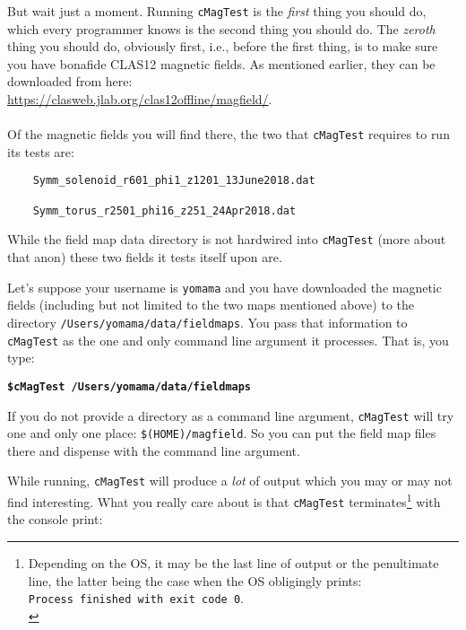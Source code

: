\documentclass{article}
\begin{document}
But wait just a moment. Running  \texttt{cMagTest} is the \textit{first} thing you should do, which every programmer knows is the second thing you should do. The \textit{zeroth} thing you should do, obviously first, i.e., before the first thing, is to make sure you have bonafide CLAS12 magnetic fields.  As mentioned earlier, they can be downloaded from here:\\

 \url{https://clasweb.jlab.org/clas12offline/magfield/}.\\
\vspace{1mm}\\
Of the magnetic fields you will find there, the two that \texttt{cMagTest}  requires to run its tests are:\\

\begin{verbatim}
    Symm_solenoid_r601_phi1_z1201_13June2018.dat

    Symm_torus_r2501_phi16_z251_24Apr2018.dat
\end{verbatim} 
\vspace{1.5mm}

While the field map data directory is not hardwired into \texttt{cMagTest} (more about that anon) these two fields it tests itself upon are. 

Let's suppose your username is \texttt{yomama} and you have downloaded the magnetic fields (including but not limited to the two maps mentioned above) to the directory \texttt{/Users/yomama/data/fieldmaps}. You pass that information to \texttt{cMagTest} as the one and only command line argument it processes. That is, you type:

\textbf{\texttt{\$cMagTest /Users/yomama/data/fieldmaps}}

If you do not provide a directory as a command line argument, \texttt{cMagTest} will try one and only one place: \texttt{\$(HOME)/magfield}. So you can put the field map files there and dispense with the command line argument.

While running, \texttt{cMagTest}  will produce a \textit{lot} of output which you may or may not find interesting.  What you really care about is that \texttt{cMagTest} terminates\footnote{Depending on the OS, it may be the last line of output or the penultimate line, the latter being the case when the OS obligingly prints:\\ \texttt{Process finished with exit code 0}.\\} with the console print: 
\end{document}
